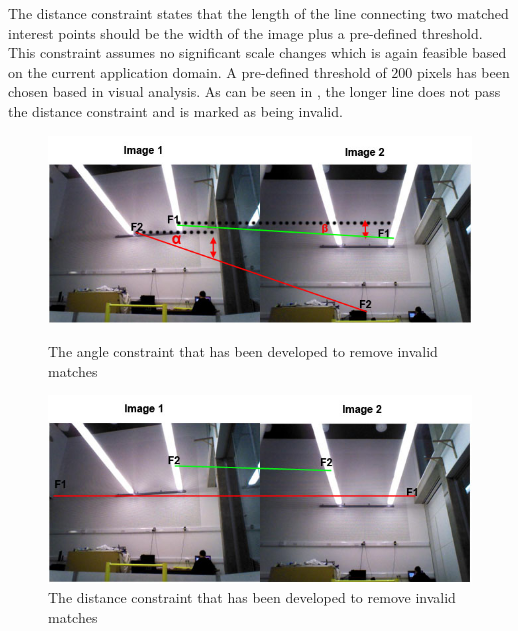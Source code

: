 \documentclass[11pt]{report}
\begin{document}
The distance constraint states that the length of the line connecting two matched interest points should be the width of the image plus a pre-defined threshold. This constraint assumes no significant scale changes which is again feasible based on the current application domain. A pre-defined threshold of $200$ pixels has been chosen based in visual analysis. As can be seen in , the longer line does not pass the distance constraint and is marked as being invalid.\\

\begin{figure}[ht!]
\begin{minipage}[b]{0.5\linewidth}
  \centering
    \includegraphics[width=1.0\textwidth]{../Drawings/constraints/angleConstraintMerged.jpg}
    \caption{The angle constraint that has been developed to remove invalid matches} 
    \label{fig:angleConstraint}
\end{minipage}
\begin{minipage}[b]{0.5\linewidth}
  \centering
    \includegraphics[width=1.0\textwidth]{../Drawings/constraints/distanceConstraint.jpg}
    \caption{The distance constraint that has been developed to remove invalid matches} 
    \label{fig:distanceConstraint}
\end{minipage}
\end{figure}
\end{document}
